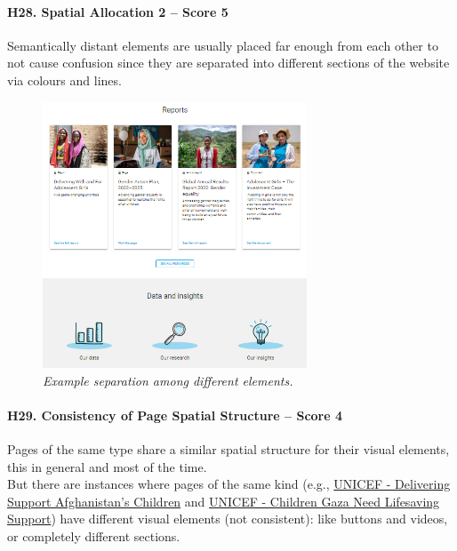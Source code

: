 \paragraph*{H28. Spatial Allocation 2 – Score 5}
Semantically distant elements are usually placed far enough from each other to not cause confusion since they are separated into different sections of the website via colours and lines.
\begin{figure}[h]
	\centering
	\begin{center}
		\includegraphics[width=0.7\textwidth]{Picture27.png}
	\end{center}
	\captionsetup{font=small}
	\caption{\textit{Example separation among different elements.}}
	\label{fig:label27}
\end{figure}

\newpage

\paragraph*{H29. Consistency of Page Spatial Structure – Score 4}
Pages of the same type share a similar spatial structure for their visual elements, this in general and most of the time.\\
But there are instances where pages of the same kind (e.g., \href{https://www.unicef.org/emergencies/delivering-support-afghanistans-children}{UNICEF - Delivering Support Afghanistan's Children} and \href{https://www.unicef.org/emergencies/children-gaza-need-lifesaving-support}{UNICEF - Children Gaza Need Lifesaving Support}) have different visual elements (not consistent): like buttons and videos, or completely different sections.
